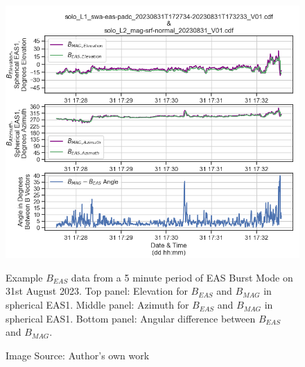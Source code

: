 \begin{figure}[h!]
    \centering
    \centerfloat
    \includegraphics[width=1.05\linewidth]{figures/Angle Example.png}
    \caption{Example \(B_{EAS}\) data from a 5 minute period of EAS Burst Mode on 31st August 2023. Top panel: Elevation for \(B_{EAS}\) and \(B_{MAG}\) in spherical EAS1. Middle panel: Azimuth for \(B_{EAS}\) and \(B_{MAG}\) in spherical EAS1. Bottom panel: Angular difference between \(B_{EAS}\) and \(B_{MAG}\).}
    \caption*{Image Source: Author's own work}
    \label{fig: angle example august}
\end{figure}

